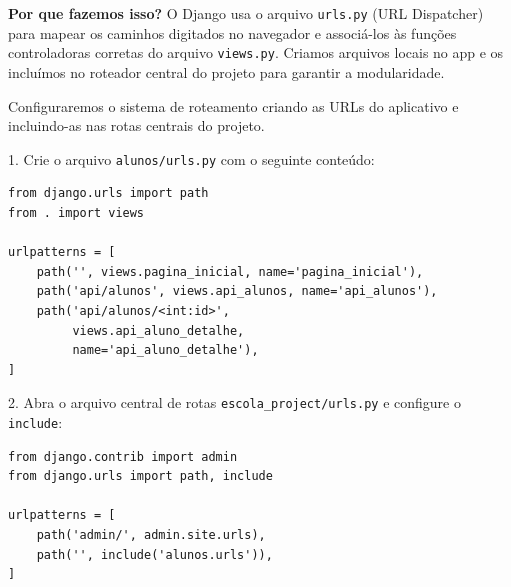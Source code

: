 \documentclass[12pt,a4paper]{article}
\begin{document}
\newpage

\begin{boxAtividade}
\textbf{Por que fazemos isso?} O Django usa o arquivo \texttt{urls.py} (URL Dispatcher) para mapear os caminhos digitados no navegador e associá-los às funções controladoras corretas do arquivo \texttt{views.py}. Criamos arquivos locais no app e os incluímos no roteador central do projeto para garantir a modularidade.

Configuraremos o sistema de roteamento criando as URLs do aplicativo e incluindo-as nas rotas centrais do projeto.

1. Crie o arquivo \texttt{alunos/urls.py} com o seguinte conteúdo:
\begin{boxCodigo}
\begin{verbatim}
from django.urls import path
from . import views

urlpatterns = [
    path('', views.pagina_inicial, name='pagina_inicial'),
    path('api/alunos', views.api_alunos, name='api_alunos'),
    path('api/alunos/<int:id>', 
         views.api_aluno_detalhe, 
         name='api_aluno_detalhe'),
]
\end{verbatim}
\end{boxCodigo}

2. Abra o arquivo central de rotas \texttt{escola\_project/urls.py} e configure o \texttt{include}:
\begin{boxCodigo}
\begin{verbatim}
from django.contrib import admin
from django.urls import path, include

urlpatterns = [
    path('admin/', admin.site.urls),
    path('', include('alunos.urls')),
]
\end{verbatim}
\end{boxCodigo}
\end{boxAtividade}
\end{document}
